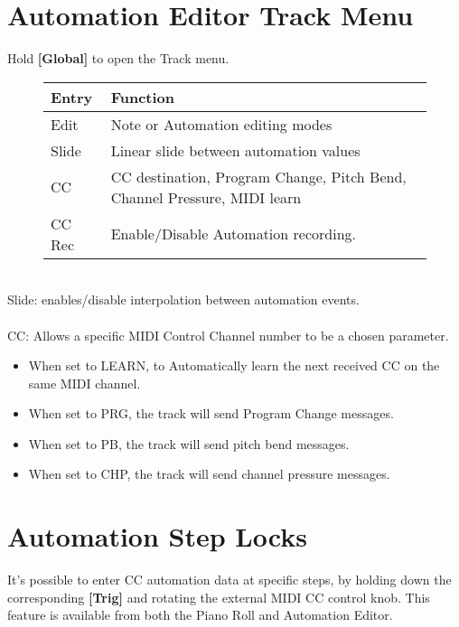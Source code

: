 \section{Automation Editor Track Menu}
Hold \textbf{[Global]} to open the Track menu.
\begin{figure}[hb]
    \begin{tabular}{|l|l|}
    \hline
    \rowcolor[HTML]{C0C0C0}
    Entry        & Function \\ \hline
    Edit         & Note or Automation editing modes\\ \hline
    Slide      & Linear slide between automation values \\ \hline
    CC         & CC destination, Program Change, Pitch Bend, Channel Pressure,  MIDI learn \\ \hline
    CC Rec      & Enable/Disable Automation recording.\\ \hline
    \end{tabular}
\end{figure}
\\
Slide: enables/disable interpolation between automation events.\\\\
CC: Allows a specific MIDI Control Channel number to be a chosen parameter.
\begin{itemize}
    \item When set to LEARN, to Automatically learn the next received CC on the same MIDI channel.
    \item When set to PRG, the track will send Program Change messages.
    \item When set to PB, the track will send pitch bend messages.
    \item When set to CHP, the track will send channel pressure messages.
\end{itemize}

\section{Automation Step Locks}
It's possible to enter CC automation data at specific steps, by holding down the corresponding \textbf{[Trig]} and rotating the external MIDI CC control knob. This feature is available from both the Piano Roll and Automation Editor.



